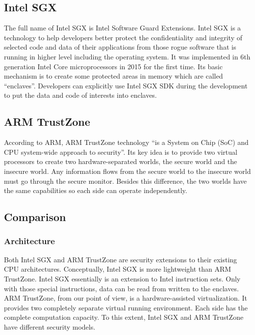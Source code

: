 \subsection{Intel SGX}
The full name of Intel SGX is Intel Software Guard Extensions. Intel
SGX is a technology to help developers better protect the 
confidentiality and integrity of selected code and data of their 
applications from those rogue software that is running in higher
level including the operating system. It was implemented in 6th
generation Intel Core microprocessors in 2015 for the first time.
Its basic mechanism is to create some protected areas in memory 
which are called ``enclaves''. Developers can explicitly use Intel
SGX SDK during the development to put the data and code of interests 
into enclaves.   


\subsection{ARM TrustZone}
According to ARM, ARM TrustZone technology ``is a System on
Chip (SoC) and CPU system-wide approach to security''. Its key
idea is to provide two virtual processors to create two 
hardware-separated worlds, the secure world and the insecure
world. Any information flows from the secure world to the 
insecure world must go through the secure monitor. Besides 
this difference, the two worlds have the same capabilities so
each side can operate independently.   

\subsection{Comparison}
\subsubsection{Architecture}
Both Intel SGX and ARM TrustZone are security extensions to 
their existing CPU architectures. Conceptually, Intel SGX
is more lightweight than ARM TrustZone.
Intel SGX essentially is an 
extension to Intel instruction sets. Only with those special 
instructions, data can be read from written to the enclaves.
ARM TrustZone, from our point of view, is a hardware-assisted
virtualization. It provides two completely separate virtual 
running environment. Each side has the complete computation 
capacity. To this extent, Intel SGX and ARM TrustZone have 
different security models.    



